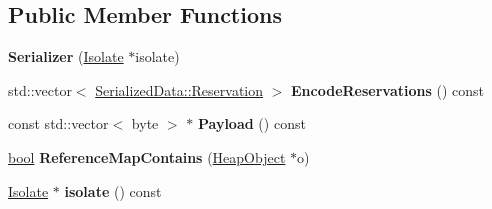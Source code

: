 \subsection*{Public Member Functions}
\begin{DoxyCompactItemize}
\item 
\mbox{\label{classv8_1_1internal_1_1Serializer_a3b236552a1009ebd6561919c67cf0f7a}} 
{\bfseries Serializer} (\mbox{\hyperlink{classv8_1_1internal_1_1Isolate}{Isolate}} $\ast$isolate)
\item 
\mbox{\label{classv8_1_1internal_1_1Serializer_a09ba46d68ef5f3e2655af921f9ccc4bb}} 
std\+::vector$<$ \mbox{\hyperlink{classv8_1_1internal_1_1SerializedData_1_1Reservation}{Serialized\+Data\+::\+Reservation}} $>$ {\bfseries Encode\+Reservations} () const
\item 
\mbox{\label{classv8_1_1internal_1_1Serializer_aaf38bb4621efa336a8def8dbe68e1cb8}} 
const std\+::vector$<$ byte $>$ $\ast$ {\bfseries Payload} () const
\item 
\mbox{\label{classv8_1_1internal_1_1Serializer_a3c1b05ba9e6afa61c3ae8622a5fbd915}} 
\mbox{\hyperlink{classbool}{bool}} {\bfseries Reference\+Map\+Contains} (\mbox{\hyperlink{classv8_1_1internal_1_1HeapObject}{Heap\+Object}} $\ast$o)
\item 
\mbox{\label{classv8_1_1internal_1_1Serializer_ab8e7deae3fc51a8dfcf3329cc74ffa1b}} 
\mbox{\hyperlink{classv8_1_1internal_1_1Isolate}{Isolate}} $\ast$ {\bfseries isolate} () const
\end{DoxyCompactItemize}
